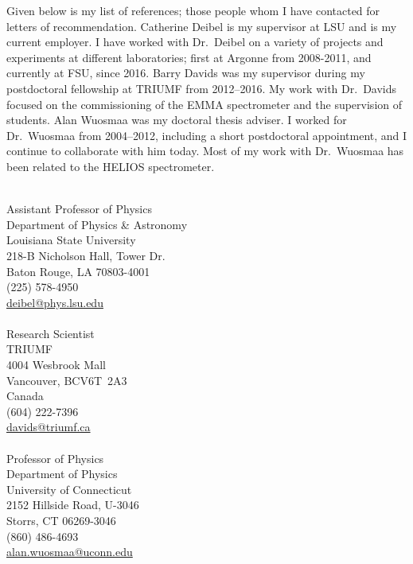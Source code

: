  {
\par Given below is my list of references; those people whom I have contacted for letters of recommendation.
Catherine Deibel is my supervisor at LSU and is my current employer. I have worked with Dr.\ Deibel on a variety of projects and experiments at different laboratories; first %
at Argonne from 2008-2011, and currently at FSU, since 2016.
Barry Davids was my supervisor during my postdoctoral fellowship at TRIUMF from 2012--2016. My work with 
 Dr.\ Davids focused on the %
 commissioning of the EMMA spectrometer and the supervision of students.
Alan Wuosmaa was my doctoral thesis adviser. I worked for Dr.\ Wuosmaa from %
2004--2012, including a short postdoctoral appointment, and I continue to collaborate with him today.  Most of my work with Dr.\ Wuosmaa has been related to the HELIOS spectrometer.
\cfoot{}
\vspace{2.0\baselineskip}%
{\setlength{\parindent}{0in}%


\\
Assistant Professor of Physics\\
Department of Physics \& Astronomy\\
Louisiana State University\\
218-B Nicholson Hall, Tower Dr.\\
Baton Rouge, LA 70803-4001\\
(225) 578-4950\\
\href{mailto:deibel@phys.lsu.edu}{deibel@phys.lsu.edu}\\
 
\\
Research Scientist\\
TRIUMF\\
4004 Wesbrook Mall\\
Vancouver, BC\hspace{6pt}V6T~2A3\\
Canada\\
(604) 222-7396\\
\href{mailto:davids@triumf.ca}{davids@triumf.ca}\\

\\
Professor of Physics\\
Department of Physics\\
University of Connecticut\\
2152 Hillside Road, U-3046\\
Storrs,  CT 06269-3046\\
(860) 486-4693\\
\href{mailto:alan.wuosmaa@uconn.edu}{alan.wuosmaa@uconn.edu}\\
}
}
